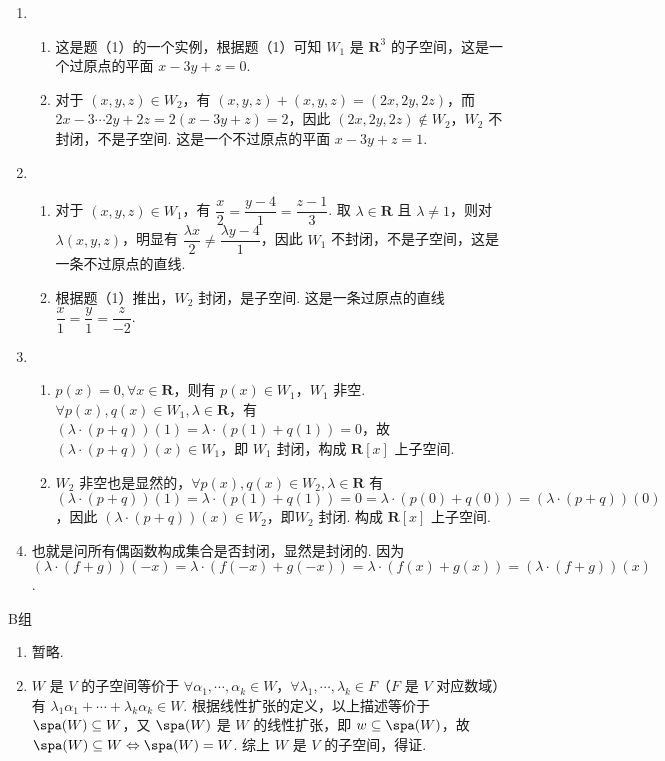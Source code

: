 \begin{enumerate}
\begin{enumerate}
        \item \begin{enumerate}
            \item 这是题（1）的一个实例，根据题（1）可知 $W_1$ 是 $\mathbf{R}^3$ 的子空间，这是一个过原点的平面 $x-3y+z=0$.
            \item 对于 $(x,y,z)\in W_2$，有 $(x,y,z)+(x,y,z)=(2x,2y,2z)$，而 $2x-3\cdots 2y+2z=2(x-3y+z)=2$，因此 $(2x,2y,2z)\not \in W_2$，$W_2$ 不封闭，不是子空间. 这是一个不过原点的平面 $x-3y+z=1$.
        \end{enumerate}

        \item \begin{enumerate}
            \item 对于 $(x,y,z)\in W_1$，有 $\dfrac x2=\dfrac{y-4}1=\dfrac{z-1}3$. 取 $\lambda \in \mathbf{R}$ 且 $\lambda\ne 1$，则对 $\lambda(x,y,z)$，明显有 $\dfrac{\lambda x}2\ne\dfrac{\lambda y-4}1$，因此 $W_1$ 不封闭，不是子空间，这是一条不过原点的直线.
            \item 根据题（1）推出，$W_2$ 封闭，是子空间. 这是一条过原点的直线 $\dfrac x1=\dfrac y1=\dfrac z{-2}$.
        \end{enumerate}

        \item \begin{enumerate}
            \item $p(x)=0,\forall x\in \mathbf{R}$，则有 $p(x)\in W_1$，$W_1$ 非空. $\forall p(x),q(x)\in W_1,\lambda \in\mathbf{R}$，有 $(\lambda\cdot(p+q))(1)=\lambda\cdot(p(1)+q(1))=0$，故$(\lambda\cdot(p+q))(x)\in W_1$，即 $W_1$ 封闭，构成 $\mathbf{R}[x]$ 上子空间.
            \item $W_2$ 非空也是显然的，$\forall p(x),q(x)\in W_2, \lambda \in \mathbf{R}$ 有 $(\lambda\cdot(p+q))(1)=\lambda\cdot(p(1)+q(1))=0=\lambda\cdot(p(0)+q(0))=(\lambda\cdot(p+q))(0)$，因此 $(\lambda\cdot(p+q))(x)\in W_2$，即$W_2$ 封闭. 构成 $\mathbf{R}[x]$ 上子空间.
        \end{enumerate}

        \item 也就是问所有偶函数构成集合是否封闭，显然是封闭的. 因为 $(\lambda\cdot(f+g))(-x)=\lambda\cdot(f(-x)+g(-x))=\lambda\cdot(f(x)+g(x))=(\lambda\cdot(f+g))(x)$.
    \end{enumerate}
\end{enumerate}

\centerline{\heiti B组}
\begin{enumerate}
    \item 暂略.
    \item $W$ 是 $V$ 的子空间等价于 $\forall \alpha_1,\cdots,\alpha_k\in W$，$\forall \lambda_1,\cdots,\lambda_k\in F$（$F$ 是 $V$ 对应数域）有 $\lambda_1\alpha_1+\cdots+\lambda_k\alpha_k\in W$. 根据线性扩张的定义，以上描述等价于 $\spa(W)\subseteq W$，又 $\spa(W)$ 是 $W$ 的线性扩张，即 $w\subseteq\spa(W)$，故$\spa(W)\subseteq W\Leftrightarrow \spa(W)=W$. 综上 $W$ 是 $V$ 的子空间，得证.
\end{enumerate}

